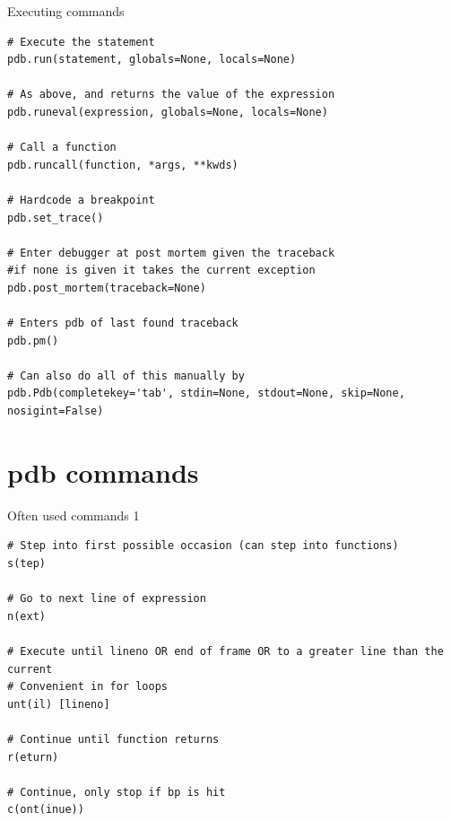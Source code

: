 \documentclass[
    size=20pt,
    style=sailor,
    display=slides,
    paper=smartboard,
    orient=landscape,
]{powerdot}
\begin{document}
\begin{slide}[method=file]{Executing commands}
\begin{verbatim}
# Execute the statement
pdb.run(statement, globals=None, locals=None)

# As above, and returns the value of the expression
pdb.runeval(expression, globals=None, locals=None)

# Call a function
pdb.runcall(function, *args, **kwds)

# Hardcode a breakpoint
pdb.set_trace()

# Enter debugger at post mortem given the traceback
#if none is given it takes the current exception
pdb.post_mortem(traceback=None)

# Enters pdb of last found traceback
pdb.pm()

# Can also do all of this manually by
pdb.Pdb(completekey='tab', stdin=None, stdout=None, skip=None, nosigint=False)
\end{verbatim}
\end{slide}


\section{pdb commands}

\begin{slide}[method=file]{Often used commands 1}
\begin{verbatim}
# Step into first possible occasion (can step into functions)
s(tep)

# Go to next line of expression
n(ext)

# Execute until lineno OR end of frame OR to a greater line than the current
# Convenient in for loops
unt(il) [lineno]

# Continue until function returns
r(eturn)

# Continue, only stop if bp is hit
c(ont(inue))
\end{verbatim}
\end{slide}
\end{document}
